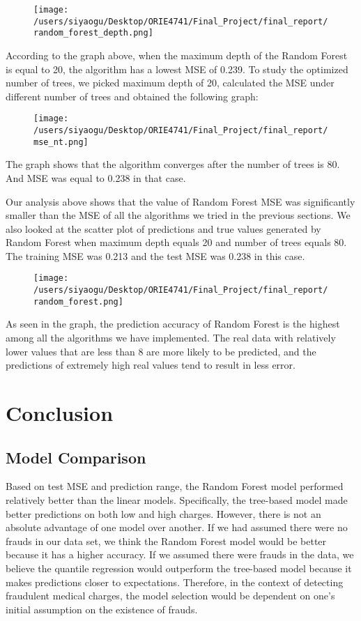 \documentclass[journal, a4paper,11pt]{IEEEtran}
\begin{document}
	\begin{figure}[ht]
	\centering
	\texttt{[image: /users/siyaogu/Desktop/ORIE4741/Final\_Project/final\_report/random\_forest\_depth.png]}
	\end{figure}
	
	According to the graph above, when the maximum depth of the Random Forest is equal to 20, the algorithm has a lowest MSE of 0.239. To study the optimized number of trees, we picked maximum depth of 20, calculated the MSE under different number of trees and obtained the following graph:
	
	\begin{figure}[ht]
	\centering
	\texttt{[image: /users/siyaogu/Desktop/ORIE4741/Final\_Project/final\_report/mse\_nt.png]}
	\end{figure}
	
	The graph shows that the algorithm converges after the number of trees is 80. And MSE was equal to 0.238 in that case.
	
	Our analysis above shows that the value of Random Forest MSE was significantly smaller than the MSE of all the algorithms we tried in the previous sections. We also looked at the scatter plot of predictions and true values generated by Random Forest when maximum depth equals 20 and number of trees equals 80. The training MSE was 0.213 and the test MSE was 0.238 in this case.
	
	\begin{figure}[ht]
	\centering
	\texttt{[image: /users/siyaogu/Desktop/ORIE4741/Final\_Project/final\_report/random\_forest.png]}
	\end{figure}
	
	As seen in the graph, the prediction accuracy of Random Forest is the highest among all the algorithms we have implemented. The real data with relatively lower values that are less than 8 are more likely to be predicted, and the predictions of extremely high real values tend to result in less error.

\section{Conclusion}

\subsection{Model Comparison}
	Based on test MSE and prediction range, the Random Forest model performed relatively better than the linear models. Specifically, the tree-based model made better predictions on both low and high charges. However, there is not an absolute advantage of one model over another. If we had assumed there were no frauds in our data set, we think the Random Forest model would be better because it has a higher accuracy. If we assumed there were frauds in the data, we believe the quantile regression would outperform the tree-based model because it makes predictions closer to expectations. Therefore, in the context of detecting fraudulent medical charges, the model selection would be dependent on one's initial assumption on the existence of frauds.
	
\end{document}
